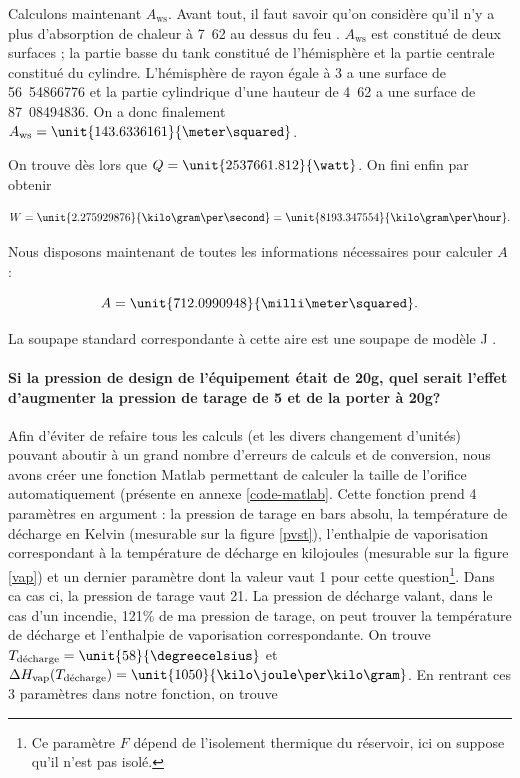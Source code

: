 Calculons maintenant $A_{\text{ws}}$. Avant tout, il faut
savoir qu'on considère qu'il n'y a plus d'absorption de chaleur
à \unit{7.62}{\meter} au dessus du feu \cite{mignon}.
$A_{\text{ws}}$ est constitué de deux surfaces ; la partie
basse du tank constitué de l'hémisphère et la partie centrale
constitué du cylindre. L'hémisphère de rayon égale à \unit{3}{\meter}
a une surface de \unit{56.54866776}{\meter\squared} et la partie
cylindrique d'une hauteur de \unit{4.62}{\meter} a une surface
de \unit{87.08494836}{\meter\squared}. On a donc finalement 
$A_{\text{ws}} = \unit{143.6336161}{\meter\squared}$.

On trouve dès lors que $Q = \unit{2537661.812}{\watt}$.
On fini enfin par obtenir 

$$W = \unit{2.275929876}{\kilo\gram\per\second} =
\unit{8193.347554}{\kilo\gram\per\hour}.$$

Nous disposons maintenant de toutes les informations nécessaires
pour calculer $A$ :

$$A = \unit{712.0990948}{\milli\meter\squared}.$$

La soupape standard correspondante à cette aire est une soupape
de modèle J \cite{mignon}.

\paragraph{Si la pression de design de l'équipement était de \unit{20}{\bbar g},
quel serait l'effet d'augmenter la pression de tarage de \unit{5}{\bbar} et de 
la porter à \unit{20}{\bbar g}?}
Afin d'éviter de refaire tous les calculs (et les divers changement d'unités)
pouvant aboutir à un grand nombre d'erreurs de calculs et de conversion, nous
avons créer une fonction Matlab permettant de calculer la taille de l'orifice
automatiquement (présente en annexe \ref{code-matlab}. Cette fonction prend 4 paramètres en argument : la pression
de tarage en bars absolu, la température de décharge en Kelvin (mesurable sur
la figure \ref{pvst}), l'enthalpie de vaporisation correspondant
à la température de décharge en kilojoules (mesurable sur la figure \ref{vap}) et un dernier
paramètre dont la valeur vaut 1 pour cette question\footnote{Ce paramètre $F$ dépend
de l'isolement thermique du réservoir, ici on suppose qu'il n'est pas isolé.}.
Dans ca cas ci, la pression de tarage vaut \unit{21}{\bbar}. La pression
de décharge valant, dans le cas d'un incendie, 121\% de ma pression de tarage,
on peut trouver la température de décharge et l'enthalpie de vaporisation
correspondante. On trouve $T_{\text{décharge}} = \unit{58}{\degreecelsius}$
et $\Delta H_{\text{vap}}(T_{\text{décharge}}) = \unit{1050}{\kilo\joule\per\kilo\gram}$.
En rentrant ces 3 paramètres dans notre fonction, on trouve 

